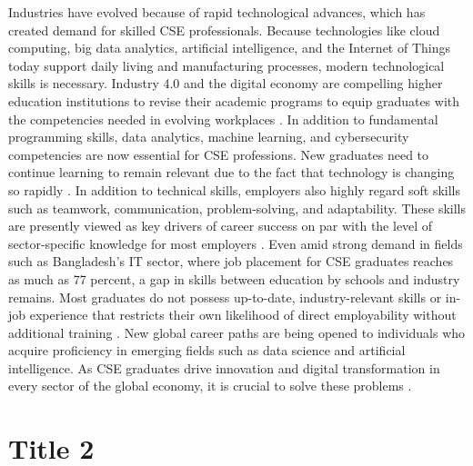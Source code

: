 \documentclass[final,5p,times,twocolumn,authoryear]{elsarticle}
\begin{document}
Industries have evolved because of rapid technological advances, which has created demand for skilled CSE professionals. Because technologies like cloud computing, big data analytics, artificial intelligence, and the Internet of Things today support daily living and manufacturing processes, modern technological skills is necessary.  Industry 4.0 and the digital economy are compelling higher education institutions to revise their academic programs to equip graduates with the competencies needed in evolving workplaces \cite{1_MisraKhurana2017} . In addition to fundamental programming skills, data analytics, machine learning, and cybersecurity competencies are now essential for CSE professions. New graduates need to continue learning to remain relevant due to the fact that technology is changing so rapidly \cite{3_DeSilva2024} . In addition to technical skills, employers also highly regard soft skills such as teamwork, communication, problem-solving, and adaptability.
These skills are presently viewed as key drivers of career success on par with the level of sector-specific knowledge for most employers \cite{5_MohammedOzdamli2024} . Even amid strong demand in fields such as Bangladesh's IT sector, where job placement for CSE graduates reaches as much as 77 percent, a gap in skills between education by schools and industry remains. Most graduates do not possess up-to-date, industry-relevant skills or in-job experience that restricts their own likelihood of direct employability without additional training \cite{4_Chakraborty2019} . New global career paths are being opened to individuals who acquire proficiency in emerging fields such as data science and artificial intelligence. As CSE graduates drive innovation and digital transformation in every sector of the global economy, it is crucial to solve these problems \cite{6_PrinceIdrisKawserAlif2025} .





\section{Title 2}
\lipsum[1]
\end{document}
